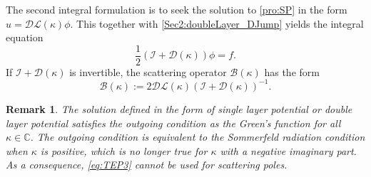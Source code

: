 \documentclass{article}
\newtheorem{remark}{Remark}[section]
\begin{document}
	
	The second integral formulation is to seek the solution  to \eqref{pro:SP}  in the form $u=\mathcal{DL}(\kappa)\phi$. This together with \eqref{Sec2:doubleLayer_DJump} yields the integral equation
	\begin{equation}\label{Sec2:BIE-D}
		\dfrac{1}{2}\left(\mathcal{I}+\mathcal{D}(\kappa)\right)\phi=f.
	\end{equation}
	If $\mathcal{I}+\mathcal{D}(\kappa)$ is invertible, the scattering operator $\mathcal{B}(\kappa)$ has the form
	\begin{equation*}
		\mathcal{B}(\kappa):=2\mathcal{DL}(\kappa)\left(\mathcal{I}+\mathcal{D}(\kappa)\right)^{-1}.
	\end{equation*}
	
	\begin{remark}
		The solution defined in the form of single layer potential or double layer potential satisfies the outgoing condition as the Green's function for all $\kappa \in {\mathbb C}$. The outgoing condition is equivalent to the Sommerfeld radiation condition when $\kappa$ is positive, which is no longer true for $\kappa$ with a negative imaginary part. As a consequence, \eqref{eq:TEP3} cannot be used for scattering poles.
	\end{remark}
	
\end{document}
